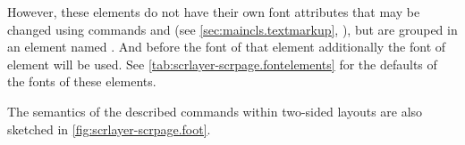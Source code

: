 %
%
However, these elements do not have their own font attributes that may be
changed using commands  and  (see
\autoref{sec:maincls.textmarkup}, ),
but are grouped in an element named . And before the
font of that element additionally the font of element
 will be used. See
\autoref{tab:scrlayer-scrpage.fontelements} for the defaults of the fonts of
these elements.%
%
%

The semantics of the described commands within two-sided layouts are also
sketched in \autoref{fig:scrlayer-scrpage.foot}.%
%
